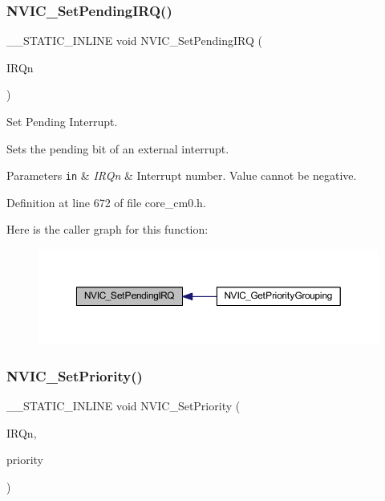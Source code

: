 \subsubsection{\texorpdfstring{N\+V\+I\+C\+\_\+\+Set\+Pending\+I\+R\+Q()}{NVIC\_SetPendingIRQ()}}
{\footnotesize\ttfamily \+\_\+\+\_\+\+S\+T\+A\+T\+I\+C\+\_\+\+I\+N\+L\+I\+NE void N\+V\+I\+C\+\_\+\+Set\+Pending\+I\+RQ (\begin{DoxyParamCaption}\item[{\hyperlink{group___configuration__section__for___c_m_s_i_s_gac3af4a32370fb28c4ade8bf2add80251}{I\+R\+Qn\+\_\+\+Type}}]{I\+R\+Qn }\end{DoxyParamCaption})}



Set Pending Interrupt. 

Sets the pending bit of an external interrupt. 
\begin{DoxyParams}[1]{Parameters}
\mbox{\tt in}  & {\em I\+R\+Qn} & Interrupt number. Value cannot be negative. \\
\hline
\end{DoxyParams}


Definition at line 672 of file core\+\_\+cm0.\+h.

Here is the caller graph for this function\+:
\nopagebreak
\begin{figure}[H]
\begin{center}
\leavevmode
\includegraphics[width=350pt]{group___c_m_s_i_s___core___n_v_i_c_functions_ga3ecf446519da33e1690deffbf5be505f_icgraph}
\end{center}
\end{figure}
\mbox{\label{group___c_m_s_i_s___core___n_v_i_c_functions_ga2305cbd44aaad792e3a4e538bdaf14f9}} 
\subsubsection{\texorpdfstring{N\+V\+I\+C\+\_\+\+Set\+Priority()}{NVIC\_SetPriority()}}
{\footnotesize\ttfamily \+\_\+\+\_\+\+S\+T\+A\+T\+I\+C\+\_\+\+I\+N\+L\+I\+NE void N\+V\+I\+C\+\_\+\+Set\+Priority (\begin{DoxyParamCaption}\item[{\hyperlink{group___configuration__section__for___c_m_s_i_s_gac3af4a32370fb28c4ade8bf2add80251}{I\+R\+Qn\+\_\+\+Type}}]{I\+R\+Qn,  }\item[{uint32\+\_\+t}]{priority }\end{DoxyParamCaption})}



